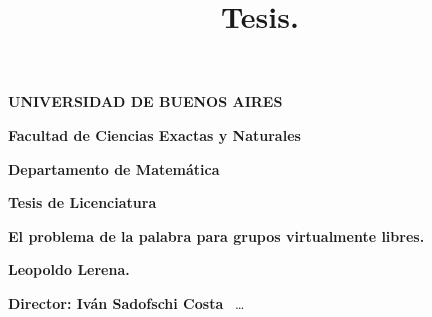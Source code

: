 \documentclass[12pt]{book}
\title{\color{red!55!black} Tesis.}
\date{}
\theoremstyle{plain} %
\theoremstyle{definition}
\theoremstyle{remark}
\begin{document}
\thispagestyle{empty}

\begin {center}


\medskip
\textbf{\color{astral!40!black} UNIVERSIDAD DE BUENOS AIRES}

\smallskip

\textbf{\color{astral!40!black}Facultad de Ciencias Exactas y Naturales}

\smallskip

\textbf{\color{astral!40!black}Departamento de Matem\'atica}

\vspace{3.5cm}

\textbf{\large \color{astral!40!black} Tesis de Licenciatura}


\vspace{1.5cm}

\textbf{\large \color{astral!40!black} El problema de la palabra para grupos virtualmente libres.}

\vspace{1.5cm}


\textbf{\color{astral!40!black} Leopoldo Lerena.}

\end {center}


\vspace{1.5cm}

\noindent \textbf{\color{astral!40!black} Director: Iván Sadofschi Costa} \ \dots


\vspace{3cm}

\tableofcontents
\newpage
	
	



\end{document}
